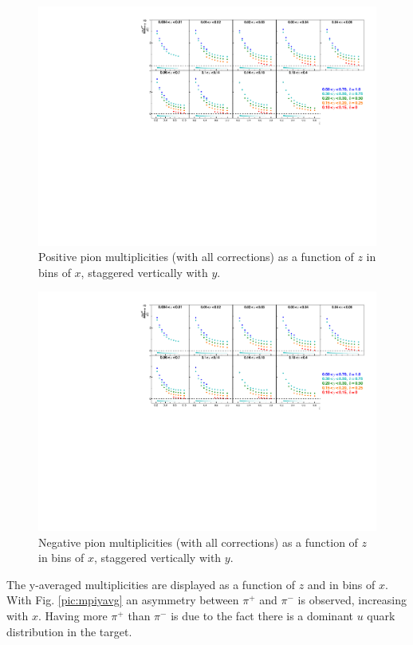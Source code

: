 \begin{figure}[!h]
  \centering
	\includegraphics[scale=0.85]{./gfx/pip.pdf}
	\caption{Positive pion multiplicities (with all corrections) as a function of $z$ in bins of $x$, staggered vertically with $y$.}
	\label{pic:mpip}
\end{figure}

\begin{figure}[!h]
  \centering
	\includegraphics[scale=0.85]{./gfx/pim.pdf}
	\caption{Negative pion multiplicities (with all corrections) as a function of $z$ in bins of $x$, staggered vertically with $y$.}
	\label{pic:mpim}
\end{figure}

The y-averaged multiplicities are displayed as a function of $z$ and in bins of $x$. With Fig. \ref{pic:mpiyavg} an asymmetry between $\pi^+$ and $\pi^-$ is observed, increasing with $x$. Having more $\pi^+$ than $\pi^-$ is due to the fact there is a dominant $u$ quark distribution in the target.

